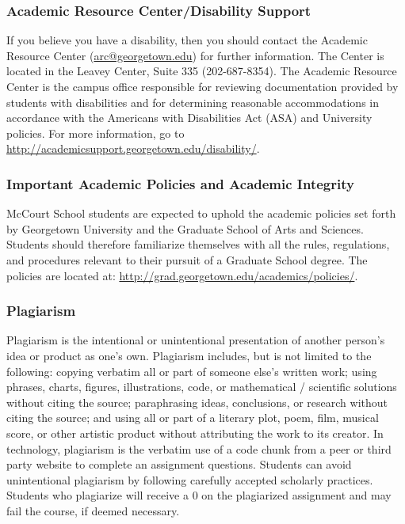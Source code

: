 \documentclass[
  12pt,
]{article}
\begin{document}
\hypertarget{academic-resource-centerdisability-support}{%
\subsubsection{Academic Resource Center/Disability
Support}\label{academic-resource-centerdisability-support}}

If you believe you have a disability, then you should contact the
Academic Resource Center (\url{arc@georgetown.edu}) for further
information. The Center is located in the Leavey Center, Suite 335
(202-687-8354). The Academic Resource Center is the campus office
responsible for reviewing documentation provided by students with
disabilities and for determining reasonable accommodations in accordance
with the Americans with Disabilities Act (ASA) and University policies.
For more information, go to
\url{http://academicsupport.georgetown.edu/disability/}.

\hypertarget{important-academic-policies-and-academic-integrity}{%
\subsubsection{Important Academic Policies and Academic
Integrity}\label{important-academic-policies-and-academic-integrity}}

McCourt School students are expected to uphold the academic policies set
forth by Georgetown University and the Graduate School of Arts and
Sciences. Students should therefore familiarize themselves with all the
rules, regulations, and procedures relevant to their pursuit of a
Graduate School degree. The policies are located at:
\href{The\%20follow\%20schedule\%20lays\%20out\%20when\%20each\%20assignment\%20will\%20be\%20assigned}{http://grad.georgetown.edu/academics/policies/}.

\hypertarget{plagiarism}{%
\subsubsection{Plagiarism}\label{plagiarism}}

Plagiarism is the intentional or unintentional presentation of another
person's idea or product as one's own. Plagiarism includes, but is not
limited to the following: copying verbatim all or part of someone else's
written work; using phrases, charts, figures, illustrations, code, or
mathematical / scientific solutions without citing the source;
paraphrasing ideas, conclusions, or research without citing the source;
and using all or part of a literary plot, poem, film, musical score, or
other artistic product without attributing the work to its creator. In
technology, plagiarism is the verbatim use of a code chunk from a peer
or third party website to complete an assignment questions. Students can
avoid unintentional plagiarism by following carefully accepted scholarly
practices. Students who plagiarize will receive a 0 on the plagiarized
assignment and may fail the course, if deemed necessary.
\end{document}
